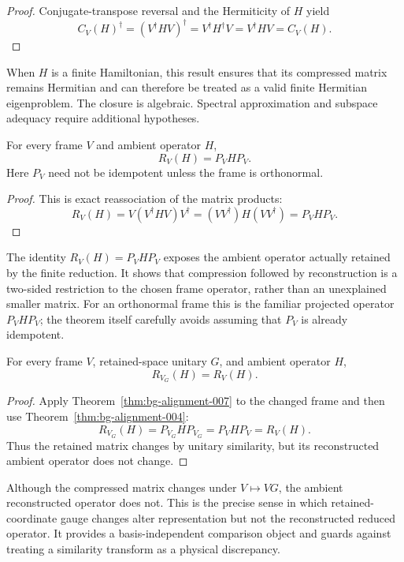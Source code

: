 \begin{proof}
Conjugate-transpose reversal and the Hermiticity of $H$ yield
\[
  C_V(H)^\dagger
  =(V^\dagger HV)^\dagger
  =V^\dagger H^\dagger V
  =V^\dagger HV
  =C_V(H).
\]
\end{proof}

When $H$ is a finite Hamiltonian, this result ensures that its compressed matrix remains
Hermitian and can therefore be treated as a valid finite Hermitian eigenproblem. The
closure is algebraic. Spectral approximation and subspace adequacy require additional
hypotheses.

\begin{theorem}
\label{thm:bg-alignment-007}
For every frame $V$ and ambient operator $H$,
\[
  R_V(H)=P_VHP_V.
\]
Here $P_V$ need not be idempotent unless the frame is orthonormal.
\end{theorem}

\begin{proof}
This is exact reassociation of the matrix products:
\[
  R_V(H)
  =V(V^\dagger HV)V^\dagger
  =(VV^\dagger)H(VV^\dagger)
  =P_VHP_V.
\]
\end{proof}

The identity $R_V(H)=P_VHP_V$ exposes the ambient operator actually retained by the
finite reduction. It shows that compression followed by reconstruction is a two-sided
restriction to the chosen frame operator, rather than an unexplained smaller matrix.
For an orthonormal frame this is the familiar projected operator $P_VHP_V$; the theorem
itself carefully avoids assuming that $P_V$ is already idempotent.

\begin{theorem}
\label{thm:bg-alignment-008}
For every frame $V$, retained-space unitary $G$, and ambient operator $H$,
\[
  R_{V_G}(H)=R_V(H).
\]
\end{theorem}

\begin{proof}
Apply Theorem~\ref{thm:bg-alignment-007} to the changed frame and then use
Theorem~\ref{thm:bg-alignment-004}:
\[
  R_{V_G}(H)=P_{V_G}HP_{V_G}=P_VHP_V=R_V(H).
\]
Thus the retained matrix changes by unitary similarity, but its reconstructed ambient
operator does not change.
\end{proof}

Although the compressed matrix changes under $V\mapsto VG$, the ambient reconstructed
operator does not. This is the precise sense in which retained-coordinate gauge changes
alter representation but not the reconstructed reduced operator. It provides a
basis-independent comparison object and guards against treating a similarity transform
as a physical discrepancy.


